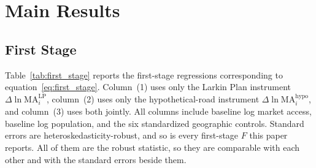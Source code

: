 %
%
%
%
%

\section{Main Results}
\label{sec:results}

\subsection{First Stage}
\label{sec:first_stage}

Table~\ref{tab:first_stage} reports the first-stage regressions
corresponding to equation~\eqref{eq:first_stage}. Column~(1) uses only
the Larkin Plan instrument $\Delta \ln \mathrm{MA}^{\mathrm{LP}}_i$,
column~(2) uses only the hypothetical-road instrument
$\Delta \ln \mathrm{MA}^{\mathrm{hypo}}_i$, and column~(3) uses both
jointly. All columns include baseline log market access, baseline log
population, and the six standardized geographic controls. Standard
errors are heteroskedasticity-robust, and so is every first-stage $F$
this paper reports. All of them are the robust statistic, so they are
comparable with each other and with the standard errors beside them.

